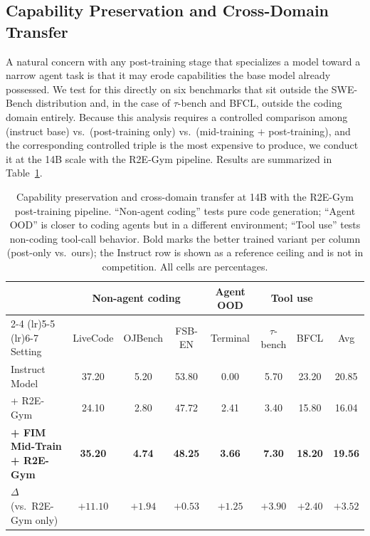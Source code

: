 \subsection{Capability Preservation and Cross-Domain Transfer}
\label{sec:exp:gen}

A natural concern with any post-training stage that specializes a model
toward a narrow agent task is that it may erode capabilities the base
model already possessed. We test for this directly on six benchmarks that
sit outside the SWE-Bench distribution and, in the case of $\tau$-bench
and BFCL, outside the coding domain entirely. Because this analysis
requires a controlled comparison among (instruct base) vs.\ (post-training
only) vs.\ (mid-training $+$ post-training), and the corresponding
controlled triple is the most expensive to produce, we conduct it at the
14B scale with the R2E-Gym pipeline. Results are summarized in
Table~\ref{tab:cap}.

\begin{table}[t]
\centering
\caption{Capability preservation and cross-domain transfer at 14B with the
R2E-Gym post-training pipeline. ``Non-agent coding'' tests pure code
generation; ``Agent OOD'' is closer to coding agents but in a different
environment; ``Tool use'' tests non-coding tool-call behavior. Bold marks
the better trained variant per column (post-only vs.\ ours); the Instruct
row is shown as a reference ceiling and is not in competition. All cells
are percentages.}
\label{tab:cap}
\small
\setlength{\tabcolsep}{4pt}
\begin{tabular}{lcccccc|c}
\toprule
& \multicolumn{3}{c}{Non-agent coding}
& \multicolumn{1}{c}{Agent OOD}
& \multicolumn{2}{c}{Tool use}
& \\
\cmidrule(lr){2-4} \cmidrule(lr){5-5} \cmidrule(lr){6-7}
Setting
& LiveCode & OJBench & FSB-EN
& Terminal
& $\tau$-bench & BFCL
& Avg \\
\midrule
Instruct Model
  & 37.20 & 5.20 & 53.80
  & 0.00
  & 5.70 & 23.20
  & 20.85 \\
+ R2E-Gym
  & 24.10 & 2.80 & 47.72
  & 2.41
  & 3.40 & 15.80
  & 16.04 \\
\textbf{+ FIM Mid-Train + R2E-Gym}
  & \textbf{35.20} & \textbf{4.74} & \textbf{48.25}
  & \textbf{3.66}
  & \textbf{7.30} & \textbf{18.20}
  & \textbf{19.56} \\
\rowcolor{blue!8}
$\Delta$ (vs.\ R2E-Gym only)
  & $+11.10$ & $+1.94$ & $+0.53$
  & $+1.25$
  & $+3.90$ & $+2.40$
  & $+3.52$ \\
\bottomrule
\end{tabular}
\end{table}

